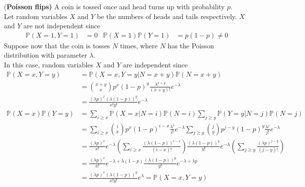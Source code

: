 \documentclass{huhtakm-template-book}
\newcommand{\prob}{\mathbb{P}}
\begin{document}
    \begin{eg}(\textbf{Poisson flips)}
        A coin is tossed once and head turns up with probability $p$.\\
        Let random variables $X$ and $Y$ be the numbers of heads and tails respectively. $X$ and $Y$ are not independent since
        \begin{align*}
            \prob(X=1,Y=1)&=0 & \prob(X=1)\prob(Y=1)&=p(1-p)\neq 0
        \end{align*}
        Suppose now that the coin is tosses $N$ times, where $N$ has the Poisson distribution with parameter $\lambda$.\\
        In this case, random variables $X$ and $Y$ are independent since
        \begin{align*}
            \prob(X=x,Y=y)&=\prob(X=x,Y=y|N=x+y)\prob(N=x+y)\\
            &=\binom{x+y}{x}p^{x}(1-p)^{y}\frac{\lambda^{x+y}}{(x+y)!}e^{-\lambda}\\
            &=\frac{(\lambda p)^{x}(\lambda(1-p))^{y}}{x!y!}e^{-\lambda}\\
            \prob(X=x)\prob(Y=y)&=\sum_{i\geq x}\prob(X=x|N=i)\prob(N=i)\sum_{j\geq y}\prob(Y=y|N=j)\prob(N=j)\\
            &=\sum_{i\geq x}\binom{i}{x}p^{x}(1-p)^{i-x}\frac{\lambda^{i}}{i!}e^{-\lambda}\sum_{j\geq y}\binom{j}{y}p^{j-y}(1-p)^{y}\frac{\lambda^{j}}{j!}e^{-\lambda}\\
            &=\frac{(\lambda p)^{x}}{x!}e^{-\lambda}\left(\sum_{i\geq x}\frac{(\lambda(1-p))^{i-x}}{(i-x)!}\right)\frac{(\lambda(1-p))^{y}}{y!}e^{-\lambda}\left(\sum_{j\geq y}\frac{(\lambda p)^{j-y}}{(j-y)!}\right)\\
            &=\frac{(\lambda p)^{x}}{x!}e^{-\lambda+\lambda(1-p)}\frac{(\lambda(1-p))^{y}}{y!}e^{-\lambda+\lambda p}\\
            &=\frac{(\lambda p)^{x}(\lambda(1-p))^{y}}{x!y!}e^{\lambda}=\prob(X=x,Y=y)
        \end{align*}
    \end{eg}
    
\end{document}
